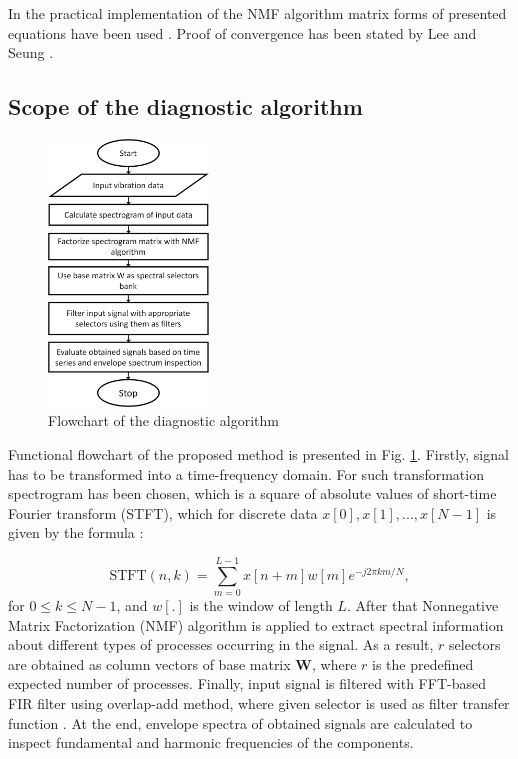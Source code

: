 \documentclass[conference]{IEEEtran}
\begin{document}
In the practical implementation of the NMF algorithm matrix forms of presented equations have been used \cite{hoyer2004non}. Proof of convergence has been stated by Lee and Seung \cite{lee2001algorithms}. 

\subsection{Scope of the diagnostic algorithm}
\begin{figure}[!ht]
\centering
\includegraphics[width = 0.38\textwidth]{figs/block.png}
\caption{Flowchart of the diagnostic algorithm}
\label{fig: block}
\end{figure}

Functional flowchart of the proposed method is presented in Fig. \ref{fig: block}. Firstly, signal has to be transformed into a time-frequency domain. For such transformation spectrogram has been chosen, which is a square of absolute values of short-time Fourier transform (STFT), which for discrete data $x[0], x[1], ... , x[N-1]$ is given by the formula \cite{alan1989discrete}:

\begin{equation}
    \textrm{STFT}(n,k)=\sum_{m=0}^{L-1}x[n+m]w[m]e^{-j2\pi km/N},
\end{equation}
for $0\leq k \leq N-1$, and $w[.]$ is the window of length $L$. After that Nonnegative Matrix Factorization (NMF) algorithm is applied to extract spectral information about different types of processes occurring in the signal. As a result, $r$ selectors are obtained as column vectors of base matrix {\bf W}, where $r$ is the predefined expected number of processes. Finally, input signal is filtered with FFT-based FIR filter using overlap-add method, where given selector is used as filter transfer function \cite{alan1989discrete}. At the end, envelope spectra of obtained signals are calculated to inspect fundamental and harmonic frequencies of the components.
\end{document}
